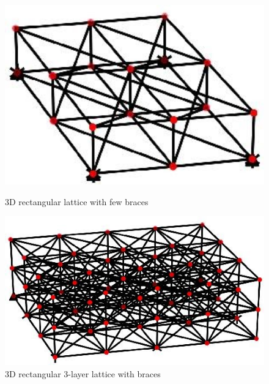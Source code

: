 \begin{figure}[!htbp]
\begin{minipage}{0.3\textwidth}
    \centering
    \includegraphics[width = 1\textwidth]{Figures/3x3reduced_bracings3d.jpg}
    \caption{3D rectangular lattice with few braces}
    \label{fig:3D_rect1}
\end{minipage}
\hspace{5mm}
\begin{minipage}{0.3\textwidth}
    \centering
    \includegraphics[width = 1\textwidth]{Figures/5x43d3layer.jpg}
    \caption{3D rectangular 3-layer lattice with braces}
    \label{fig:3d_rect2}
\end{minipage}
\hspace{5mm}
\begin{minipage}{0.3\textwidth}
    \centering

\end{minipage}
\end{figure}

